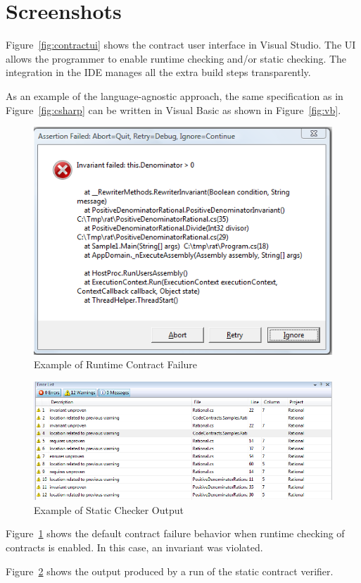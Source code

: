 \documentclass[10pt,twocolumn]{article}
\begin{document}
\section{Screenshots}
Figure~\ref{fig:contractui} shows the contract user interface in
Visual Studio. The UI allows the programmer to enable runtime checking
and/or static checking. The integration in the IDE manages all the
extra build steps transparently.

As an example of the language-agnostic approach, the same
specification as in Figure~\ref{fig:csharp} can be written in Visual
Basic as shown in Figure~\ref{fig:vb}.

\begin{figure}[htb]
\begin{center}
  \includegraphics[width=\columnwidth]{FoxtrotOutput.png}
\end{center}
\caption{Example of Runtime Contract Failure}
\label{fig:foxtrot}
\end{figure}

\begin{figure}[tb]
\begin{center}
  \includegraphics[width=2\columnwidth]{staticCheckerOutput.png}
\end{center}
\caption{Example of Static Checker Output}
\label{fig:clousot}
\end{figure}

Figure~\ref{fig:foxtrot} shows the default contract failure behavior
when runtime checking of contracts is enabled. In this case, an
invariant was violated.

Figure~\ref{fig:clousot} shows the output produced by a run of the
static contract verifier.




\end{document}
